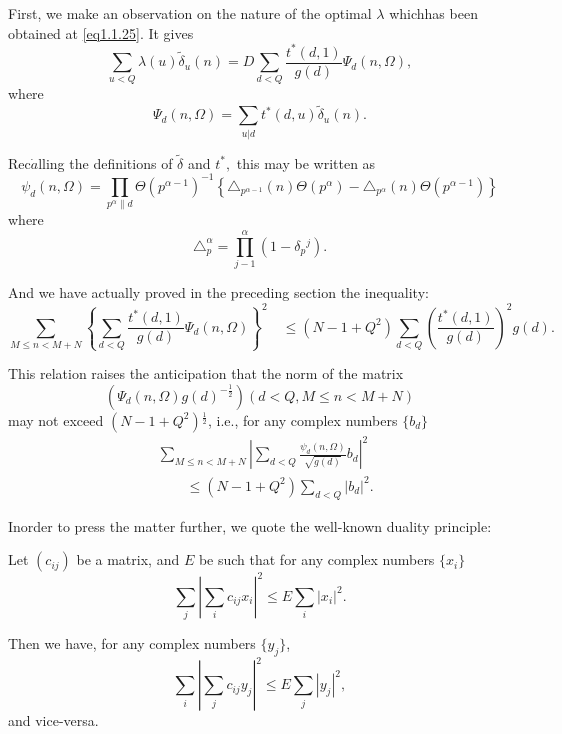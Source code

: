 First, we make an observation on the nature of the optimal $\lambda$
which\pageoriginale has been obtained at \eqref{eq1.1.25}. It gives 
\begin{equation*}
  \sum_{u<Q}\lambda(u)\tilde{\delta}_u (n)=D
  \sum_{d<Q}\frac{t^*(d,1)}{g(d)}\Psi_d (n,\Omega ),
  \tag{1.2.1} \label{eq1.2.1} 
\end{equation*}
where
\begin{equation*}
  \Psi_d(n,\Omega)=\sum_{u| d}
  t^*(d,u)\tilde{\delta}_u(n).\tag{1.2.2}\label{eq1.2.2} 
\end{equation*}

Rec$\dot{a}$lling the definitions of $\tilde{\delta}$ and $t^*,$ this
may be written as  
\begin{equation*} 
  \psi_d(n,\Omega)=\prod_{p^\alpha \|
    d}\Theta(p^{\alpha-1})^{-1} \left\{\triangle_{p^{\alpha-1}}
  (n)\Theta(p^\alpha)-\triangle_{p^\alpha}(n)\Theta(p^{\alpha-1})\right\}\tag{1.2.3}\label{eq1.2.3} 
\end{equation*}
where
$$
\triangle_p^{\alpha}=\prod_{j-1}^\alpha (1-\delta_p{^j}).
$$
 
And we have  actually proved in the preceding section the inequality:
 $$
 \sum_{M\leq
   n<M+N}\left\{\sum_{d<Q}\frac{t^*(d,1)}{g(d)}\Psi_d(n,\Omega)
 \right\}^2 \quad
 \leq(N-1+Q^2)\sum_{d<Q}\left(\frac{t^*(d,1)}{g(d)}\right)^2 g(d). 
 $$

 This relation raises the anticipation that the norm of the matrix
 $$
 (\Psi_d(n,\Omega)g(d)^{-\frac{1}{2}})(d<Q,M\leq n<M+N)
 $$
 may not exceed $(N-1+Q^2){^{\frac{1}{2}}}$, i.e., for any complex
 numbers $ \{b_d\} $ 
 \begin{equation*}
\begin{split}
 & \sum_{M \leq n < M+N} | \sum_{d<Q} \frac{\psi_{d} (n, \Omega
   )}{\sqrt{g(d)}}b_{d} |^2 \\
  &\qquad \leq (N-1+Q^2)\sum_{d<Q}|b_d|^2. 
\end{split}
\tag{1.2.4}\label{eq1.2.4}
 \end{equation*} 

In\pageoriginale order to press the matter further, we quote the
well-known duality principle: 
 
\begin{Lemma}\label{part1-chap1:sec1.2:lem2}%
  Let $(c_{ij})$ be a matrix, and $E$ be such that for any complex
  numbers $\{x_i\}$ 
  $$
  \sum_j |\sum_i c_{ij}x_i |^2\leq E \sum_{i}| x_i |^2.
  $$

  Then we have, for any complex numbers $\{y_j\}$,
  $$
  \sum_i |\sum_j c_{ij} y_j |^2 \leq E \sum_j |y_j |^2,
  $$
  and vice-versa.
\end{Lemma} 

